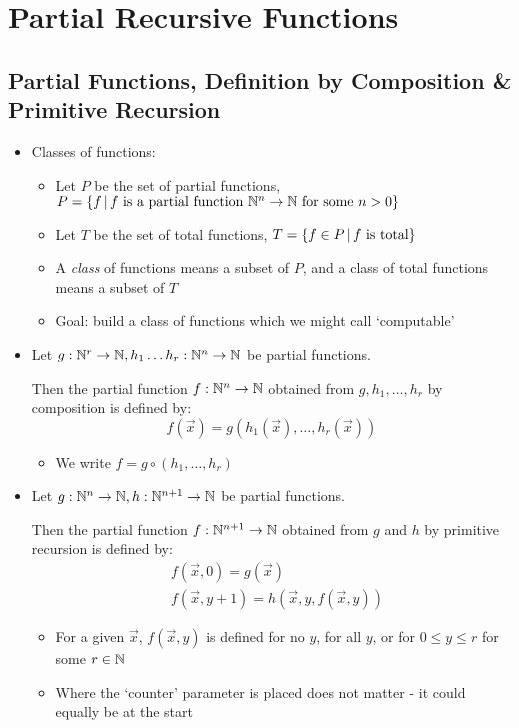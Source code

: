 \section{Partial Recursive Functions}

\subsection{Partial Functions, Definition by Composition \& Primitive Recursion}

\begin{itemize}
	
	\item Classes of functions:
	
	\begin{itemize}
		
		\item Let $ P $ be the set of partial functions, $ P = \left\lbrace f \, | \, f \text{ is a partial function } \mathbb{N}^n \to \mathbb{N} \text{ for some } n > 0 \right\rbrace $
		
		\item Let $ T $ be the set of total functions, $ T = \left\lbrace f \in P \, | \, f \text{ is total} \right\rbrace $
		
		\item A \textit{class} of functions means a subset of $ P $, and a class of total functions means a subset of $ T $
		
		\item Goal: build a class of functions which we might call `computable'
		
	\end{itemize}
	
	\item Let $ g: \mathbb{N}^r \to \mathbb{N}, h_1 \dots h_r: \mathbb{N}^n \to \mathbb{N} $ be partial functions.
	
	Then the partial function $ f: \mathbb{N}^n \to \mathbb{N} $ obtained from $ g, h_1, \dots, h_r $ by composition is defined by:
	\begin{equation*}
	f(\vec{x}) = g(h_1(\vec{x}), \dots, h_r(\vec{x}))
	\end{equation*}
	\begin{itemize}
		\item We write $f = g \circ (h_1, \dots, h_r) $
	\end{itemize}
	
	\item Let $ g: \mathbb{N}^n \to \mathbb{N}, h: \mathbb{N}^{n+1} \to \mathbb{N} $ be partial functions.
	
	Then the partial function $ f: \mathbb{N}^{n+1} \to \mathbb{N} $ obtained from $ g $ and $ h $ by primitive recursion is defined by:
	\begin{align*}
	&f(\vec{x}, 0) = g(\vec{x})\\
	&f(\vec{x}, y + 1) = h(\vec{x}, y, f(\vec{x}, y))
	\end{align*}
	\begin{itemize}
		\item For a given $ \vec{x} $, $ f(\vec{x}, y) $ is defined for no $ y $, for all $ y $, or for $ 0 \le y \le r $ for some $ r \in \mathbb{N} $
		\item Where the `counter' parameter is placed does not matter - it could equally be at the start
	\end{itemize}
	 

\end{itemize}
